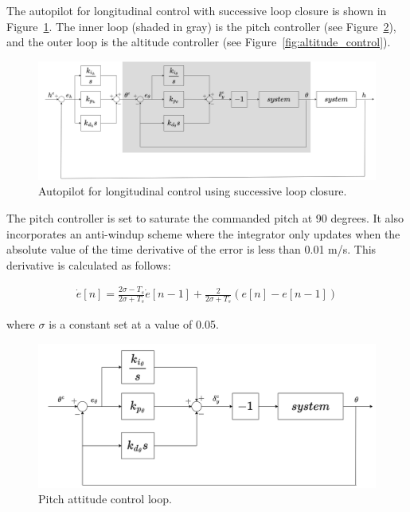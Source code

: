 \documentclass{article}
\begin{document}
The autopilot for longitudinal control with successive loop closure is shown in Figure~\ref{fig:long_control}. The inner loop (shaded in gray) is the pitch controller (see Figure~\ref{fig:pitch_control}), and the outer loop is the altitude controller (see Figure~\ref{fig:altitude_control}).

\begin{figure}[h!]
    \includegraphics[width=1.0\linewidth]{./figures/longitudinal_controller.drawio.png}
    \caption{Autopilot for longitudinal control using successive loop closure.}
    \label{fig:long_control}
\end{figure}

\FloatBarrier

The pitch controller is set to saturate the commanded pitch at 90 degrees. It also incorporates an anti-windup scheme where the integrator only updates when the absolute value of the time derivative of the error is less than 0.01 m/s. This derivative is calculated as follows:

\begin{align*}
	\dot e[n] = \frac{2\sigma - T_s}{2\sigma + T_s}\dot e[n-1] + \frac{2}{2\sigma + T_s}(e[n] - e[n - 1])
\end{align*}

where $\sigma$ is a constant set at a value of 0.05.

\begin{figure}[h!]
    \includegraphics[width=1.0\linewidth]{./figures/pitch_controller.drawio.png}
    \caption{Pitch attitude control loop.}
    \label{fig:pitch_control}
\end{figure} 
\end{document}
